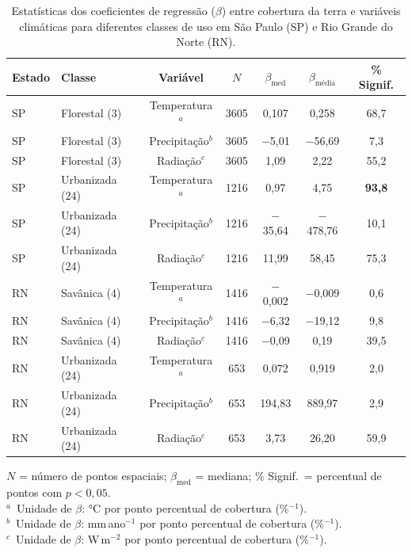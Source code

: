 \begin{table}[H]
    \centering
    \caption{Estatísticas dos coeficientes de regressão ($\beta$) entre cobertura da terra e variáveis climáticas para diferentes classes de uso em São Paulo (SP) e Rio Grande do Norte (RN).}
    \label{tab:beta_cobertura_clima_completa}
    \small
    \begin{tabular}{llccccc}
        \hline
        \textbf{Estado} & \textbf{Classe} & \textbf{Variável} & $N$ & $\beta_{\text{med}}$ & $\beta_{\text{média}}$ & \textbf{\% Signif.} \\
        \hline
        SP & Florestal (3)   & Temperatura$^{a}$  & 3605 & 0,107    & 0,258     & 68,7 \\
        SP & Florestal (3)   & Precipitação$^{b}$ & 3605 & $-$5,01  & $-$56,69  & 7,3  \\
        SP & Florestal (3)   & Radiação$^{c}$     & 3605 & 1,09     & 2,22      & 55,2 \\
        \hline
        SP & Urbanizada (24) & Temperatura$^{a}$  & 1216 & 0,97     & 4,75      & \textbf{93,8} \\
        SP & Urbanizada (24) & Precipitação$^{b}$ & 1216 & $-$35,64 & $-$478,76 & 10,1 \\
        SP & Urbanizada (24) & Radiação$^{c}$     & 1216 & 11,99    & 58,45     & 75,3 \\
        \hline
        RN & Savânica (4)    & Temperatura$^{a}$  & 1416 & $-$0,002 & $-$0,009  & 0,6  \\
        RN & Savânica (4)    & Precipitação$^{b}$ & 1416 & $-$6,32  & $-$19,12  & 9,8  \\
        RN & Savânica (4)    & Radiação$^{c}$     & 1416 & $-$0,09  & 0,19      & 39,5 \\
        \hline
        RN & Urbanizada (24) & Temperatura$^{a}$  & 653  & 0,072    & 0,919     & 2,0  \\
        RN & Urbanizada (24) & Precipitação$^{b}$ & 653  & 194,83   & 889,97    & 2,9  \\
        RN & Urbanizada (24) & Radiação$^{c}$     & 653  & 3,73     & 26,20     & 59,9 \\
        \hline
    \end{tabular}

    \vspace{2mm}
    {\footnotesize
        $N$ = número de pontos espaciais; $\beta_{\text{med}}$ = mediana;
        \% Signif.\ = percentual de pontos com $p < 0{,}05$. \\[2pt]
        $^{a}$~Unidade de $\beta$: °C por ponto percentual de cobertura (\%$^{-1}$). \\
        $^{b}$~Unidade de $\beta$: mm\,ano$^{-1}$ por ponto percentual de cobertura (\%$^{-1}$). \\
        $^{c}$~Unidade de $\beta$: W\,m$^{-2}$ por ponto percentual de cobertura (\%$^{-1}$).
    }
\end{table}



